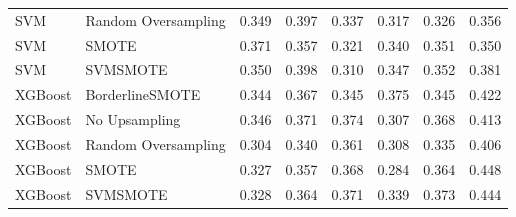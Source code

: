 \begin{tabular}{llllllll}
                         SVM & Random Oversampling & 0.349 &                     0.397 &                 0.337 &                  0.317 &                                   0.326 &     0.356 \\
                         SVM &               SMOTE & 0.371 &                     0.357 &                 0.321 &                  0.340 &                                   0.351 &     0.350 \\
                         SVM &            SVMSMOTE & 0.350 &                     0.398 &                 0.310 &                  0.347 &                                   0.352 &     0.381 \\
                     XGBoost &     BorderlineSMOTE & 0.344 &                     0.367 &                 0.345 &                  0.375 &                                   0.345 &     0.422 \\
                     XGBoost &       No Upsampling & 0.346 &                     0.371 &                 0.374 &                  0.307 &                                   0.368 &     0.413 \\
                     XGBoost & Random Oversampling & 0.304 &                     0.340 &                 0.361 &                  0.308 &                                   0.335 &     0.406 \\
                     XGBoost &               SMOTE & 0.327 &                     0.357 &                 0.368 &                  0.284 &                                   0.364 &     0.448 \\
                     XGBoost &            SVMSMOTE & 0.328 &                     0.364 &                 0.371 &                  0.339 &                                   0.373 &     0.444 \\
\bottomrule
\end{tabular}
